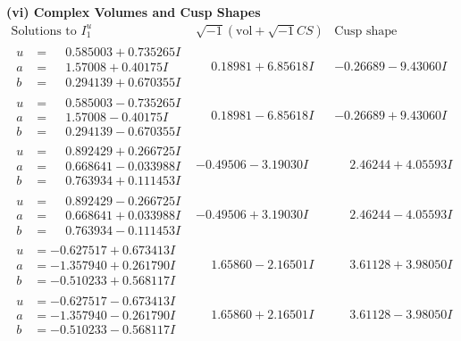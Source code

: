 \documentclass[1p]{elsarticle_modified}
\theoremstyle{definition}
\newcommand{\I}{\sqrt{-1}}
\begin{document}
\newpage\flushleft \textbf{(vi) Complex Volumes and Cusp Shapes}
$$\begin{array}{c|c|c}  
\text{Solutions to }I^u_{1}& \I (\text{vol} + \sqrt{-1}CS) & \text{Cusp shape}\\
 \hline 
\begin{aligned}
u &= \phantom{-}0.585003 + 0.735265 I \\
a &= \phantom{-}1.57008 + 0.40175 I \\
b &= \phantom{-}0.294139 + 0.670355 I\end{aligned}
 & \phantom{-}0.18981 + 6.85618 I & -0.26689 - 9.43060 I \\ \hline\begin{aligned}
u &= \phantom{-}0.585003 - 0.735265 I \\
a &= \phantom{-}1.57008 - 0.40175 I \\
b &= \phantom{-}0.294139 - 0.670355 I\end{aligned}
 & \phantom{-}0.18981 - 6.85618 I & -0.26689 + 9.43060 I \\ \hline\begin{aligned}
u &= \phantom{-}0.892429 + 0.266725 I \\
a &= \phantom{-}0.668641 - 0.033988 I \\
b &= \phantom{-}0.763934 + 0.111453 I\end{aligned}
 & -0.49506 - 3.19030 I & \phantom{-}2.46244 + 4.05593 I \\ \hline\begin{aligned}
u &= \phantom{-}0.892429 - 0.266725 I \\
a &= \phantom{-}0.668641 + 0.033988 I \\
b &= \phantom{-}0.763934 - 0.111453 I\end{aligned}
 & -0.49506 + 3.19030 I & \phantom{-}2.46244 - 4.05593 I \\ \hline\begin{aligned}
u &= -0.627517 + 0.673413 I \\
a &= -1.357940 + 0.261790 I \\
b &= -0.510233 + 0.568117 I\end{aligned}
 & \phantom{-}1.65860 - 2.16501 I & \phantom{-}3.61128 + 3.98050 I \\ \hline\begin{aligned}
u &= -0.627517 - 0.673413 I \\
a &= -1.357940 - 0.261790 I \\
b &= -0.510233 - 0.568117 I\end{aligned}
 & \phantom{-}1.65860 + 2.16501 I & \phantom{-}3.61128 - 3.98050 I \\ \hline\begin{aligned}

\end{aligned}
\end{array}$$
\end{document}
